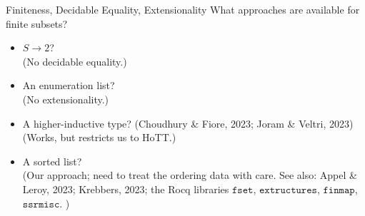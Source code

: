 \documentclass[aspectratio=169]{beamer}
\begin{document}
\begin{frame}{Finiteness, Decidable Equality, Extensionality}
  What approaches are available for finite subsets?
\begin{itemize}
          \smallskip
  \item  $S \to 2$? \\
        (No decidable equality.)
  \smallskip
  \item An enumeration list? \\
        (No extensionality.)
  \smallskip
  \item A higher-inductive type? (Choudhury \& Fiore, 2023; Joram \& Veltri, 2023)\\
        (Works, but restricts us to HoTT.)
  \smallskip
  \item A sorted list? \\
        (Our approach; need to treat the ordering data with care. See also: Appel \& Leroy, 2023; Krebbers, 2023; the Rocq libraries $\mathtt{fset}$, $\mathtt{extructures}$, $\mathtt{finmap}$, $\mathtt{ssrmisc}$. )
\end{itemize}
\end{frame}
\end{document}
